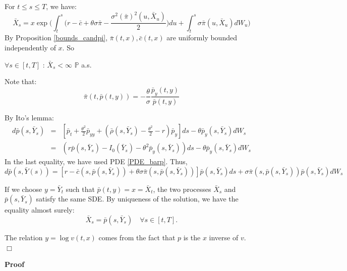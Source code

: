 \documentclass[11pt, psfig]{article}
\theoremstyle{definition}
\theoremstyle{remark}
\numberwithin{equation}{section}
\def\sP{\mathbb{P}}
\newcommand{\be}{\begin{equation}}
\newcommand{\ee}{\end{equation}}
\def \proof{{\noindent \bf Proof}\quad}
\def \ep{\hbox{ }\hfill$\Box$}
\begin{document}
{ For $t\leq s\leq T$, we have:
 \be
 \bar{X}_s = x \exp\bigg(\int_t^s \bigg( r-\bar{c}+\theta \sigma\bar{\pi}-\frac{\sigma^2 (\bar{\pi})^2(u,\bar{X}_u)}{2} \bigg)du+\int_t^s \sigma \bar{\pi}(u,\bar{X}_u) dW_u\bigg)
 \ee
  By Proposition \ref{bounds_candpi}, $\bar{\pi}(t,x), \bar{c}(t,x)$ are uniformly bounded independently of $x$.
So 

$\forall s\in [t,T]$ : $\bar{X}_s<\infty$ $\sP$ a.s.
 
 
  Note that:
  \be
  \bar{\pi}(t,\bar{p}(t,y))=-\frac{\theta}{\sigma} \frac{\bar{p}_y(t,y)}{\bar{p}(t,y)}
  \ee
  
 By Ito's lemma: 
 \begin{eqnarray*}
 d\bar{p}(s,\bar{Y}_s) &=& [\bar{p}_t+\frac{\theta^2}{2}\bar{p}_{yy}+(\bar{\rho}(s,\bar{Y}_{s})-\frac{\theta^2}{2}-r)\bar{p}_y ] ds -\theta \bar{p}_y(s,\bar{Y}_{s})dW_s\\
 & = &
 (r\bar{p}(s,\bar{Y}_{s})-I_0(\bar{Y}_s)-\theta^2 \bar{p}_y(s,\bar{Y}_{s}))ds-\theta \bar{p}_y(s,\bar{Y}_{s})dW_s
 \end{eqnarray*}
 In the last equality, we have used PDE \eqref{PDE_barp}.
Thus,
  $$d\bar{p}(s,\bar{Y}(s))=
 [r-\bar{c}(s,\bar{p}(s,\bar{Y}_s))+\theta \sigma\bar{\pi}(s,\bar{p}(s,\bar{Y}_s))]\bar{p}(s,\bar{Y}_s) ds+\sigma \bar{\pi}(s,\bar{p}(s,\bar{Y}_s))\bar{p}(s,\bar{Y}_s) dW_s$$
 

 
 If we choose $y=\bar{Y}_t$ such that  $\bar{p}(t,y)=x=\bar{X}_t$,  the two processes  $\bar{X}_s$ and $\bar{p}(s,\bar{Y}_s)$ satisfy the same SDE. By
  uniqueness of the solution, we have the equality almost surely:
 $$ \bar{X}_s =\bar{p}(s,\bar{Y}_s) \quad \forall s\in [t,T]. $$
 
 The relation $y=\log v(t,x)$ comes from the fact that $p$ is the $x$ inverse of $v$.
 \ep

\proof{ Theorem \ref{subgame} }

}
\end{document}
